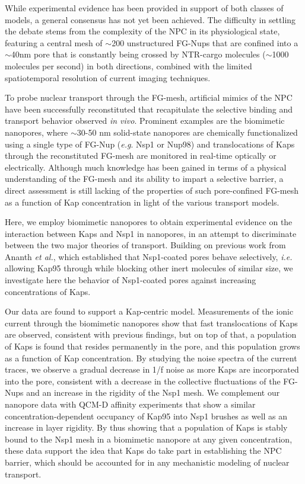 While experimental evidence has been provided in support of both classes of models, a general consensus has not yet been achieved. The difficulty in settling the debate stems from the complexity of the NPC in its physiological state, featuring a central mesh of $\sim$200 unstructured FG-Nups that are confined into a $\sim$40nm pore that is constantly being crossed by NTR-cargo molecules ($\sim$1000 molecules per second) in both directions, combined with the limited spatiotemporal resolution of current imaging techniques\cite{Kim2018,Veenhoff2007,Ribbeck2001}.


To probe nuclear transport through the FG-mesh, artificial mimics of the NPC have been successfully reconstituted that recapitulate the selective binding and transport behavior observed \emph{in vivo}\cite{Jovanovic-Talisman2009,Kowalczyk2011a,Eisele2010a,Malekian2018,Schoch2012,Schmidt2015}. Prominent examples are the biomimetic nanopores, where $\sim$30-50 nm solid-state nanopores are chemically functionalized using a single type of FG-Nup (\emph{e.g}. Nsp1 or Nup98) and translocations of Kaps through the reconstituted FG-mesh are monitored in real-time optically\cite{Jovanovic-Talisman2009} or electrically\cite{Kowalczyk2011a,Ananth2018,Fragasso2021}. Although much knowledge has been gained in terms of a physical understanding of the FG-mesh and its ability to impart a selective barrier, a direct assessment is still lacking of the properties of such pore-confined FG-mesh as a function of Kap concentration in light of the various transport models.


Here, we employ biomimetic nanopores to obtain experimental evidence on the interaction between Kaps and Nsp1 in nanopores, in an attempt to discriminate between the two major theories of transport. Building on previous work from Ananth \emph{et al.}\cite{Ananth2018}, which established that Nsp1-coated pores behave selectively, \emph{i.e.} allowing Kap95 through while blocking other inert molecules of similar size, we investigate here the behavior of Nsp1-coated pores against increasing concentrations of Kaps.


Our data are found to support a Kap-centric model. Measurements of the ionic current through the biomimetic nanopores show that fast translocations of Kaps are observed, consistent with previous findings\cite{Ananth2018}, but on top of that, a population of Kaps is found that resides permanently in the pore, and this population grows as a function of Kap concentration. By studying the noise spectra of the current traces, we observe a gradual decrease in 1/f noise as more Kaps are incorporated into the pore, consistent with a decrease in the collective fluctuations of the FG-Nups and an increase in the rigidity of the Nsp1 mesh. We complement our nanopore data with QCM-D affinity experiments that show a similar concentration-dependent occupancy of Kap95 into Nsp1 brushes as well as an increase in layer rigidity. By thus showing that a population of Kaps is stably bound to the Nsp1 mesh in a biomimetic nanopore at any given concentration, these data support the idea that Kaps do take part in establishing the NPC barrier, which should be accounted for in any mechanistic modeling of nuclear transport.


